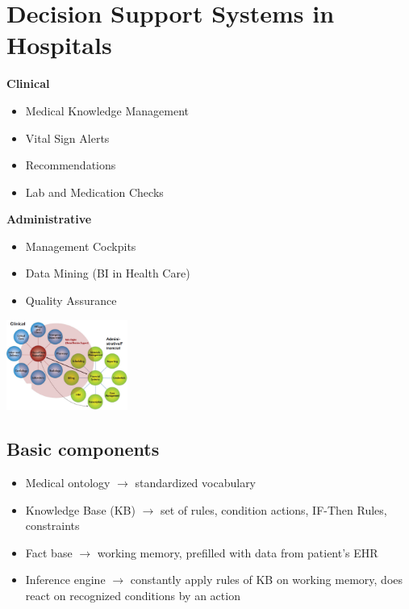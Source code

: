 \documentclass{report}
\newenvironment{Figure}
	{\par\medskip\noindent\minipage{\linewidth}}
	{\endminipage\par\medskip}
\theoremstyle{definition}
\theoremstyle{example}
\begin{document}
\section{Decision Support Systems in Hospitals}
\textbf{Clinical}
\begin{itemize}
   \item Medical Knowledge Management
   \item Vital Sign Alerts
   \item Recommendations
   \item Lab and Medication Checks
\end{itemize}
\textbf{Administrative}
\begin{itemize}
   \item Management Cockpits
   \item Data Mining (BI in Health Care)
   \item Quality Assurance
\end{itemize}

\begin{Figure}
   \centering
    \includegraphics[width=150px]{img/DCSS.png}
        \label{fig:Decision Support Systems in Hospitals}
\end{Figure}

\subsection{Basic components}
\begin{itemize}
   \item Medical ontology $\rightarrow$ standardized vocabulary
   \item Knowledge Base (KB) $\rightarrow$ set of rules, condition actions, IF-Then Rules, constraints
   \item Fact base $\rightarrow$ working memory, prefilled with data from patient's EHR
   \item Inference engine $\rightarrow$ constantly apply rules of KB on working memory, does react on recognized conditions by an action
\end{itemize}
\end{document}
